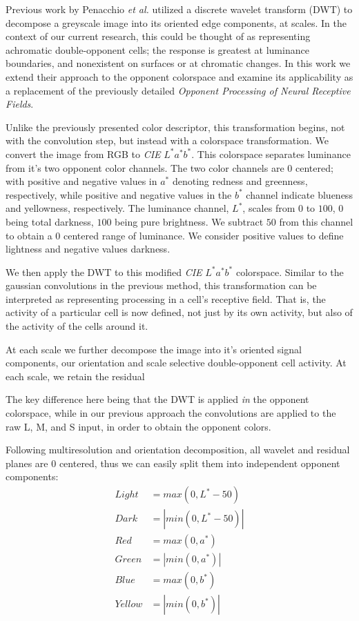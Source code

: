 \documentclass[journal,onecolumn]{IEEEtran}
\begin{document}
Previous work by Penacchio \textit{et al.} \cite{penacchio:2013} utilized a discrete wavelet transform (DWT) to decompose a greyscale image into its oriented edge components, at scales. In the context of our current research, this could be thought of as representing achromatic double-opponent cells; the response is greatest at luminance boundaries, and nonexistent on surfaces or at chromatic changes. In this work we extend their approach to the opponent colorspace and examine its applicability as a replacement of the previously detailed \textit{Opponent Processing of Neural Receptive Fields}.

Unlike the previously presented color descriptor, this transformation begins, not with the convolution step, but instead with a colorspace transformation. We convert the image from RGB to \textit{CIE} $L^*a^*b^*$. This colorspace separates luminance from it's two opponent color channels. The two color channels are $0$ centered; with positive and negative values in $a^*$ denoting redness and greenness, respectively, while positive and negative values in the $b^*$ channel indicate blueness and yellowness, respectively. The luminance channel, $L^*$, scales from $0$ to $100$, $0$ being total darkness, $100$ being pure brightness. We subtract $50$ from this channel to obtain a $0$ centered range of luminance. We consider positive values to define lightness and negative values darkness.

We then apply the DWT to this modified \textit{CIE} $L^*a^*b^*$ colorspace. Similar to the gaussian convolutions in the previous method, this transformation can be interpreted as representing processing in a cell's receptive field. That is, the activity of a particular cell is now defined, not just by its own activity, but also of the activity of the cells around it.

At each scale we further decompose the image into it's oriented signal components, our orientation and scale selective double-opponent cell activity. At each scale, we retain the residual 

The key difference here being that the DWT is applied \textit{in} the opponent colorspace, while in our previous approach the convolutions are applied to the raw L, M, and S input, in order to obtain the opponent colors.

Following multiresolution and orientation decomposition, all wavelet and residual planes are $0$ centered, thus we can easily split them into independent opponent components:
\begin{align}
    Light  &=   max(0, L^*-50)   \\
    Dark   &= | min(0, L^*-50) | \\
    Red    &=   max(0, a^*)      \\
    Green  &= | min(0, a^*) |    \\
    Blue   &=   max(0, b^*)      \\
    Yellow &= | min(0, b^*) |
\end{align}
\end{document}
